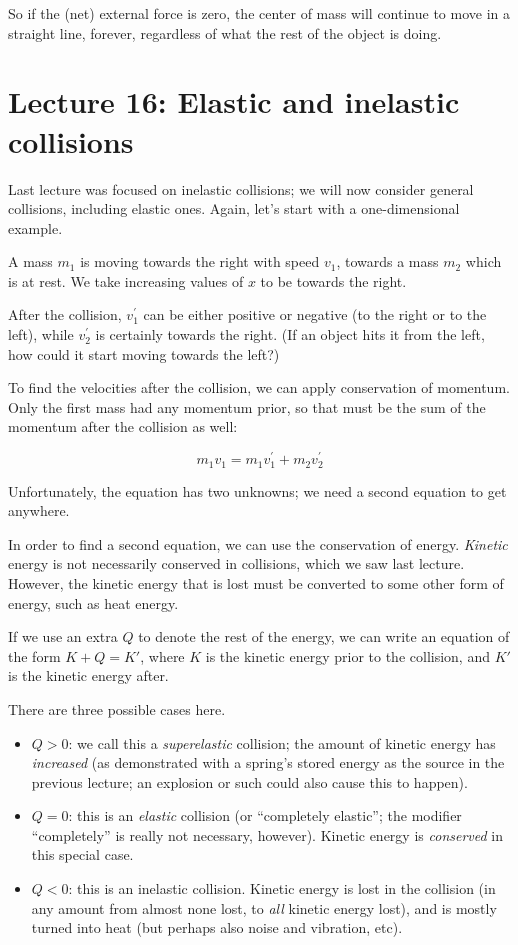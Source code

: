 So if the (net) external force is zero, the center of mass will continue to move in a straight line, forever, regardless of what the rest of the object is doing.

\section{Lecture 16: Elastic and inelastic collisions}

Last lecture was focused on inelastic collisions; we will now consider general collisions, including elastic ones. Again, let's start with a one-dimensional example.

A mass $m_1$ is moving towards the right with speed $v_1$, towards a mass $m_2$ which is at rest. We take increasing values of $x$ to be towards the right.

After the collision, $v_1^{'}$ can be either positive or negative (to the right or to the left), while $v_2^{'}$ is certainly towards the right. (If an object hits it from the left, how could it start moving towards the left?)

To find the velocities after the collision, we can apply conservation of momentum. Only the first mass had any momentum prior, so that must be the sum of the momentum after the collision as well:

\begin{equation}
m_1 v_1 = m_1 v_1^{'} + m_2 v_2^{'}
\end{equation}

Unfortunately, the equation has two unknowns; we need a second equation to get anywhere.

In order to find a second equation, we can use the conservation of energy. \emph{Kinetic} energy is not necessarily conserved in collisions, which we saw last lecture. However, the kinetic energy that is lost must be converted to some other form of energy, such as heat energy.

If we use an extra $Q$ to denote the rest of the energy, we can write an equation of the form $K + Q = K'$, where $K$ is the kinetic energy prior to the collision, and $K'$ is the kinetic energy after.

There are three possible cases here.

\begin{itemize}
\item $Q > 0$: we call this a \emph{superelastic} collision; the amount of kinetic energy has \emph{increased} (as demonstrated with a spring's stored energy as the source in the previous lecture; an explosion or such could also cause this to happen).
\item $Q = 0$: this is an \emph{elastic} collision (or ``completely elastic''; the modifier ``completely'' is really not necessary, however). Kinetic energy is \emph{conserved} in this special case.
\item $Q < 0$: this is an inelastic collision. Kinetic energy is lost in the collision (in any amount from almost none lost, to \emph{all} kinetic energy lost), and is mostly turned into heat (but perhaps also noise and vibration, etc).
\end{itemize}

